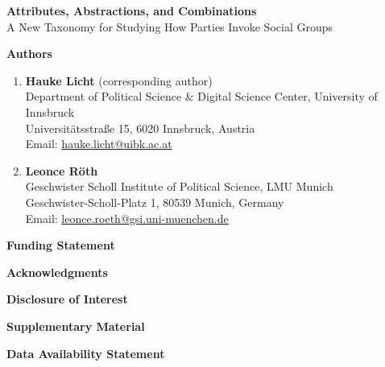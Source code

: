 %
\thispagestyle{empty}
\begin{center}
  {\LARGE \bfseries Attributes, Abstractions, and Combinations}\\[0.3em]
  {\Large A New Taxonomy for Studying How Parties Invoke Social Groups}
\end{center}

\bigskip
\noindent\textbf{Authors}
\begin{enumerate}
\item \textbf{Hauke Licht} (corresponding author)\\
  Department of Political Science \& Digital Science Center, University of Innsbruck\\
  Universitätsstraße 15, 6020 Innsbruck, Austria\\
  Email: \href{mailto:hauke.licht@uibk.ac.at}{hauke.licht@uibk.ac.at}
\item \textbf{Leonce Röth}\\
  Geschwister Scholl Institute of Political Science, LMU Munich\\
  Geschwister-Scholl-Platz 1, 80539 Munich, Germany\\
  Email: \href{mailto:leonce.roeth@gsi.uni-muenchen.de}{leonce.roeth@gsi.uni-muenchen.de}
\end{enumerate}

\bigskip
\noindent\textbf{Funding Statement}\par


\bigskip
\noindent\textbf{Acknowledgments}\par


\bigskip
\noindent\textbf{Disclosure of Interest}\par


\bigskip
\noindent\textbf{Supplementary Material}\par


\bigskip
\noindent\textbf{Data Availability Statement}\par


\clearpage
